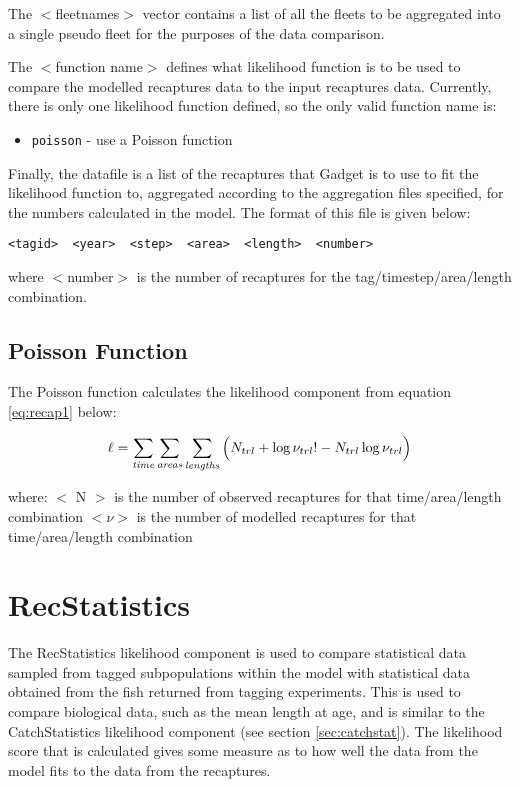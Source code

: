 \documentclass[]{book}
\providecommand{\tightlist}{%
  \setlength{\itemsep}{0pt}\setlength{\parskip}{0pt}}
\begin{document}
The \(<\)fleetnames\(>\) vector contains a list of all the fleets to be
aggregated into a single pseudo fleet for the purposes of the data
comparison.

The \(<\)function name\(>\) defines what likelihood function is to be used
to compare the modelled recaptures data to the input recaptures data.
Currently, there is only one likelihood function defined, so the only
valid function name is:

\begin{itemize}
\tightlist
\item
  \texttt{poisson} - use a Poisson function
\end{itemize}

Finally, the datafile is a list of the recaptures that Gadget is to use
to fit the likelihood function to, aggregated according to the
aggregation files specified, for the numbers calculated in the model.
The format of this file is given below:

\begin{verbatim}
<tagid>  <year>  <step>  <area>  <length>  <number>
\end{verbatim}

where \(<\)number\(>\) is the number of recaptures for the
tag/timestep/area/length combination.

\hypertarget{poisson-function}{%
\subsection{Poisson Function}\label{poisson-function}}

The Poisson function calculates the likelihood component from
equation \eqref{eq:recap1} below:

\begin{equation}
\label{eq:recap1}
\ell = \sum_{\it time}\sum_{\it areas}\sum_{\it lengths} \Big( N_{trl} + \log \nu_{trl}! - N_{trl} \log \nu_{trl} \Big)\end{equation}

where: \(<\) N \(>\) is the number of observed recaptures for that
time/area/length combination \(<\nu>\) is the number of modelled
recaptures for that time/area/length combination

\hypertarget{sec:recstat}{%
\section{RecStatistics}\label{sec:recstat}}

The RecStatistics likelihood component is used to compare statistical
data sampled from tagged subpopulations within the model with
statistical data obtained from the fish returned from tagging
experiments. This is used to compare biological data, such as the mean
length at age, and is similar to the CatchStatistics likelihood
component (see section \ref{sec:catchstat}). The likelihood score that is calculated
gives some measure as to how well the data from the model fits to the
data from the recaptures.
\end{document}

